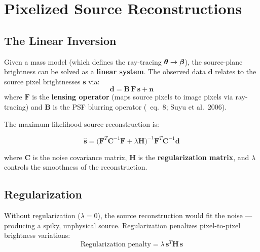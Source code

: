 \documentclass[11pt, letterpaper]{article}
\begin{document}
\section{Pixelized Source Reconstructions}
\label{sec:pixelization}

\subsection{The Linear Inversion}

Given a mass model (which defines the ray-tracing $\bm{\theta} \to \bm{\beta}$),
the source-plane brightness can be solved as a \textbf{linear system}.
The observed data $\mathbf{d}$ relates to the source pixel brightnesses
$\mathbf{s}$ via:
\begin{equation}
\mathbf{d} = \mathbf{B}\,\mathbf{F}\,\mathbf{s} + \mathbf{n}
\label{eq:linear-system}
\end{equation}
where $\mathbf{F}$ is the \textbf{lensing operator} (maps source pixels
to image pixels via ray-tracing) and $\mathbf{B}$ is the PSF blurring
operator (\Night\ eq.~8; Suyu et al.\ 2006).

The maximum-likelihood source reconstruction is:
\begin{keyresult}
\begin{equation}
\hat{\mathbf{s}} = \bigl(\mathbf{F}^T \mathbf{C}^{-1} \mathbf{F}
+ \lambda \mathbf{H}\bigr)^{-1} \mathbf{F}^T \mathbf{C}^{-1} \mathbf{d}
\label{eq:source-inversion}
\end{equation}
\end{keyresult}

\noindent where $\mathbf{C}$ is the noise covariance matrix,
$\mathbf{H}$ is the \textbf{regularization matrix}, and $\lambda$
controls the smoothness of the reconstruction.

\subsection{Regularization}

Without regularization ($\lambda = 0$), the source reconstruction would
fit the noise — producing a spiky, unphysical source. Regularization
penalizes pixel-to-pixel brightness variations:
\begin{equation}
\text{Regularization penalty} = \lambda\,\mathbf{s}^T \mathbf{H}\,\mathbf{s}
\label{eq:regularization}
\end{equation}
\end{document}
